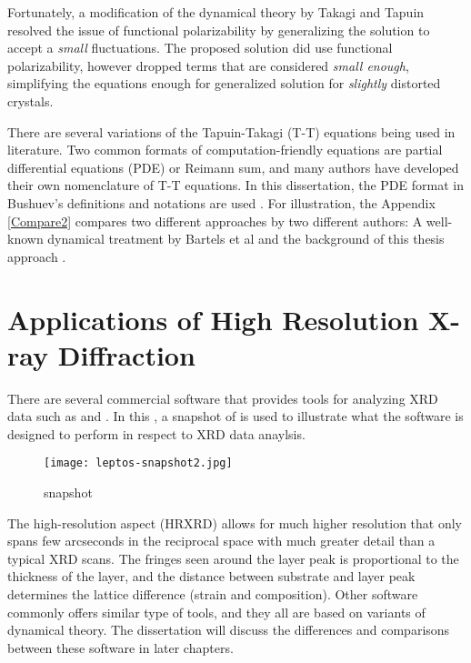 Fortunately, a modification of the dynamical theory by Takagi and Tapuin\cite{Takagi1,Takagi2,Taupin1} resolved the issue of functional polarizability by generalizing the solution to accept a \emph{small} fluctuations.  The proposed solution did use functional polarizability, however dropped terms that are considered \emph{small enough}, simplifying the equations enough for generalized solution for \emph{slightly} distorted crystals.

There are several variations of the Tapuin-Takagi (T-T) equations being used in literature.  Two common formats of computation-friendly equations are partial differential equations (PDE) or Reimann sum, and many authors have developed their own nomenclature of T-T equations.    In this dissertation, the PDE format in Bushuev's definitions and notations are used \cite{Bushuev1,Bushuev2}.  For illustration, the Appendix \ref{Compare2} compares two different approaches by two different authors:  A well-known dynamical treatment by Bartels et al  \cite{BHL1} and the background of this thesis approach \cite{Bushuev1,Bushuev2}.



	\section{Applications of High Resolution X-ray Diffraction}

There are several commercial software that provides tools for analyzing XRD data such as \LEPTOS \cite{LEPTOS}  and \RADS \cite{RADS}.  In this ,  a snapshot of \LEPTOS is used to illustrate what the software is designed to perform in respect to XRD data anaylsis.

\begin{figure}[h]
\centering
\caption{\LEPTOS snapshot}
\label{Leptos1}
\texttt{[image: leptos-snapshot2.jpg]}
\end{figure}

The high-resolution aspect (HRXRD) allows for much higher resolution that only spans few arcseconds in the reciprocal space with much greater detail than a typical XRD scans.  The fringes seen around the layer peak is proportional to the thickness of the layer, and the distance between substrate and layer peak determines the lattice difference (strain and composition).  Other software commonly offers similar type of tools, and they all are based on variants of dynamical theory.  The dissertation will discuss the differences and comparisons between these software in later chapters.


